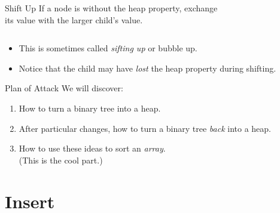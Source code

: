 \documentclass[14pt,aspectratio=1610]{beamer}
\begin{document}
\begin{frame}{Shift Up}
If a node is without the heap property, exchange \\
its value with the larger child's value.

\begin{columns}[T]
\centering
{}

\end{columns}

\begin{itemize}
\item<5->
  This is sometimes called \emph{sifting up} or bubble up.
\item<6->
  Notice that the child may have \emph{lost} the heap property during shifting.
\end{itemize}
\end{frame}

\begin{frame}{Plan of Attack}
We will discover:\\[1em]
\begin{enumerate}
\item<2->
  How to turn a binary tree into a heap.
\item<3->
  After particular changes, how to turn a binary tree \emph{back} into a heap.
\item<4->
  How to use these ideas to sort an \emph{array}.\\
  (This is the cool part.)
\end{enumerate}
\end{frame}

\section{Insert}
\end{document}
